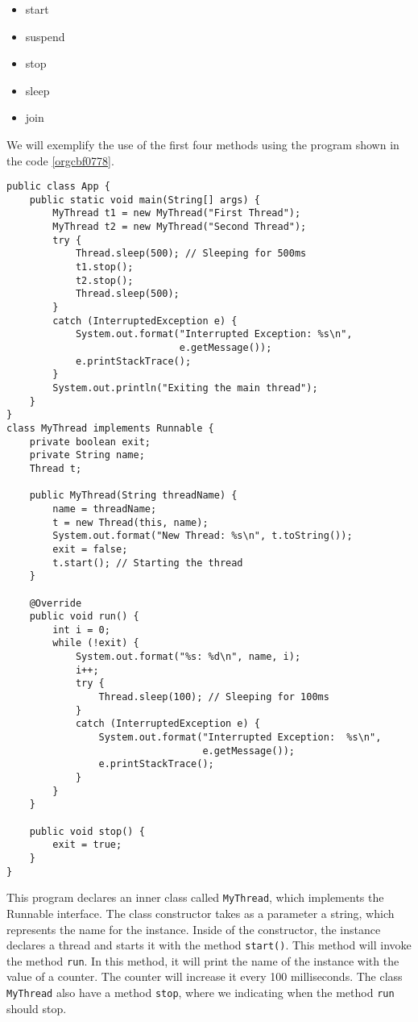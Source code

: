 \documentclass{latex/classes/myarticle}
\begin{document}
\begin{itemize}
\item start
\item suspend
\item stop
\item sleep
\item join
\end{itemize}

We will exemplify the use of the first four methods using the program shown
in the code \ref{orgcbf0778}.

\begin{lstlisting}
public class App {
    public static void main(String[] args) {
        MyThread t1 = new MyThread("First Thread");
        MyThread t2 = new MyThread("Second Thread");
        try {
            Thread.sleep(500); // Sleeping for 500ms
            t1.stop();
            t2.stop();
            Thread.sleep(500);
        }
        catch (InterruptedException e) {
            System.out.format("Interrupted Exception: %s\n",
                              e.getMessage());
            e.printStackTrace();
        }
        System.out.println("Exiting the main thread");
    }
}
class MyThread implements Runnable {
    private boolean exit;
    private String name;
    Thread t;

    public MyThread(String threadName) {
        name = threadName;
        t = new Thread(this, name);
        System.out.format("New Thread: %s\n", t.toString());
        exit = false;
        t.start(); // Starting the thread
    }

    @Override
    public void run() {
        int i = 0;
        while (!exit) {
            System.out.format("%s: %d\n", name, i);
            i++;
            try {
                Thread.sleep(100); // Sleeping for 100ms
            }
            catch (InterruptedException e) {
                System.out.format("Interrupted Exception:  %s\n",
                                  e.getMessage());
                e.printStackTrace();
            }
        }
    }

    public void stop() {
        exit = true;
    }
}
\end{lstlisting}

This program declares an inner class called \texttt{MyThread}, which implements the
Runnable interface. The class constructor takes as a parameter a string,
which represents the name for the instance. Inside of the constructor, the
instance declares a thread and starts it with the method \texttt{start()}. This
method will invoke the method \texttt{run}. In this method, it will print the name of
the instance with the value of a counter. The counter will increase it every
100 milliseconds. The class \texttt{MyThread} also have a method \texttt{stop}, where we
indicating when the method \texttt{run} should stop.
\end{document}
